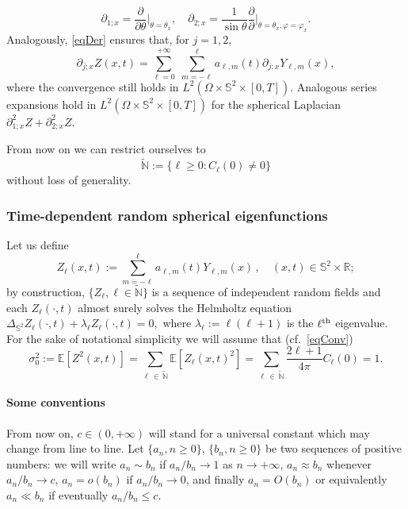 \documentclass[10pt]{amsart}
\theoremstyle{definition}\newtheorem{defi}[theo]{Definition}\newtheorem{rema}[theo]{Remark}\newtheorem{exam}[theo]{Example}\newtheorem{exem}[theo]{Example}\newtheorem{nota}[theo]{Notation}
\newcommand{\bbS}{\mathbb{S}}
\newcommand{\bbR}{\mathbb{R}}
\newcommand{\bbE}{\mathbb{E}}
\newcommand{\bbN}{\mathbb{N}}
\begin{document}
\begin{equation*}
\partial_{1;x} = \frac{\partial}{\partial \theta}\bigg|_{\theta=\theta_x},\quad
\partial_{2;x}= \frac{1}{\sin\theta}\frac{\partial}{\partial}\bigg|_{\theta=\theta_x, \varphi=\varphi_x}.
\end{equation*}
Analogously, \eqref{eqDer} ensures that, for $j=1,2$,
\begin{equation}\label{eqSeries_gradient}
\partial_{j;x} Z(x,t) = \sum_{\ell =0}^{+\infty}\;\sum_{m=-\ell}^\ell a_{\ell,m}(t) \partial_{j;x} Y_{\ell,m}(x),
\end{equation}
where the convergence still holds in $L^2(\Omega \times \bbS^2 \times [0,T])$. Analogous series expansions hold in $L^2(\Omega \times \bbS^2 \times [0,T])$ for the spherical Laplacian $\partial^2_{1;x} Z + \partial^2_{2;x}Z$.

From now on we can restrict ourselves to
\begin{equation*}
\widetilde{\bbN} := \{ \ell \ge 0 : C_\ell(0)\ne 0\}
\end{equation*}
without loss of generality.

\subsubsection{Time-dependent random spherical eigenfunctions}
\label{sec-rsh}

Let us define
\begin{equation}\label{eqZell}
Z_\ell(x,t) := \sum_{m=-\ell}^\ell a_{\ell,m}(t) Y_{\ell,m}(x)\,, \quad (x,t)\in \bbS^2\times \bbR;
\end{equation}
by construction, $\{ Z_\ell, \ell\in \widetilde{\bbN}\}$ is a sequence of independent random fields and each $Z_\ell(\cdot, t)$ almost surely solves the Helmholtz equation $\Delta_{\bbS^2} Z_{\ell }(\cdot, t)+\lambda_\ell Z_{\ell }(\cdot, t)=0, $ where $\lambda_\ell:=\ell (\ell +1)$ is the $\ell^{\rm th}$ eigenvalue. For the sake of notational simplicity we will assume that (cf.~\eqref{eqConv})
\begin{equation}\label{somma1}
\sigma _{0}^{2}:=\bbE\left[Z^{2}(x,t)\right] =\sum_{\ell\,\in\,\widetilde{\bbN}} \bbE\left[Z_\ell(x,t)^2\right]=\sum_{\ell\,\in\,\widetilde{
\bbN}}\frac{2\ell +1}{4\pi }C_{\ell }(0)=1.
\end{equation}

\paragraph{Some conventions} 
From now on, $c\in (0, +\infty)$ will stand for a universal constant which may change from line to line. Let $\{ a_n, n\ge 0\}$, $\{ b_n, n\ge 0\}$ be two sequences of positive numbers: we will write $a_n \sim b_n$ if $a_n/b_n \to 1$ as $n\to +\infty$, $ a_n \approx b_n$ whenever $a_n/b_n \to c$, $a_n = o(b_n)$ if $a_n/b_n \to 0$, and finally $a_n = O(b_n)$ or equivalently $a_n \ll b_n$ if eventually $ a_n/b_n \le c$.
\end{document}
